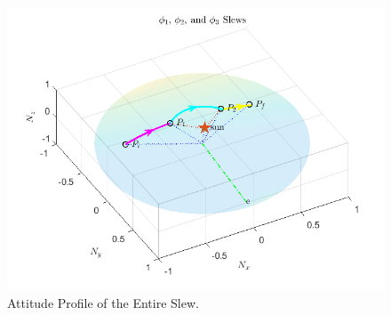 \documentclass[letterpaper, preprint, paper,11pt]{AAS}	%
\begin{document}


\begin{figure}[H]
	\begin{center}
		\includegraphics[width=4.75in]{figures/alphaNot0/phi1_phi2_phi3.png}
		\caption{Attitude Profile of the Entire Slew.}
		\label{fig:phi1_phi2_phi3}
	\end{center}		
\end{figure}	
\end{document}
